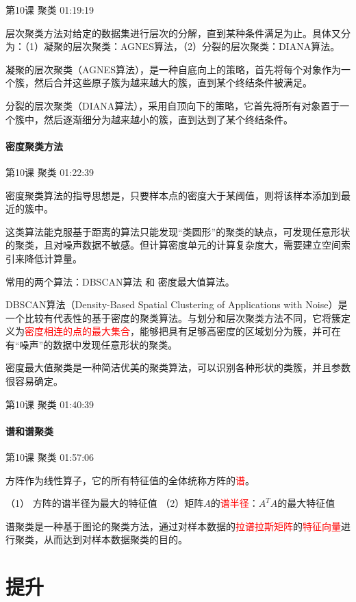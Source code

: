 \documentclass[UTF8]{ctexbook}
\begin{document}
第10课 聚类 01:19:19

层次聚类方法对给定的数据集进行层次的分解，直到某种条件满足为止。具体又分为：（1）凝聚的层次聚类：AGNES算法，（2）分裂的层次聚类：DIANA算法。

凝聚的层次聚类（AGNES算法），是一种自底向上的策略，首先将每个对象作为一个簇，然后合并这些原子簇为越来越大的簇，直到某个终结条件被满足。

分裂的层次聚类（DIANA算法），采用自顶向下的策略，它首先将所有对象置于一个簇中，然后逐渐细分为越来越小的簇，直到达到了某个终结条件。

\subsubsection{密度聚类方法}

第10课 聚类 01:22:39

密度聚类算法的指导思想是，只要样本点的密度大于某阈值，则将该样本添加到最近的簇中。

这类算法能克服基于距离的算法只能发现“类圆形”的聚类的缺点，可发现任意形状的聚类，且对噪声数据不敏感。但计算密度单元的计算复杂度大，需要建立空间索引来降低计算量。

常用的两个算法：DBSCAN算法 和 密度最大值算法。

DBSCAN算法（Density-Based Spatial Clustering of Applications with Noise）是一个比较有代表性的基于密度的聚类算法。与划分和层次聚类方法不同，它将簇定义为\textcolor{red}{密度相连的点的最大集合}，能够把具有足够高密度的区域划分为簇，并可在有“噪声”的数据中发现任意形状的聚类。

密度最大值聚类是一种简洁优美的聚类算法，可以识别各种形状的类簇，并且参数很容易确定。

第10课 聚类 01:40:39

\subsubsection{谱和谱聚类}

第10课 聚类 01:57:06

方阵作为线性算子，它的所有特征值的全体统称方阵的\textcolor{red}{谱}。

（1） 方阵的谱半径为最大的特征值
（2）矩阵$A$的\textcolor{red}{谱半径}：$A^{T}A$的最大特征值

谱聚类是一种基于图论的聚类方法，通过对样本数据的\textcolor{red}{拉谱拉斯矩阵}的\textcolor{red}{特征向量}进行聚类，从而达到对样本数据聚类的目的。

\chapter{提升}
\end{document}
